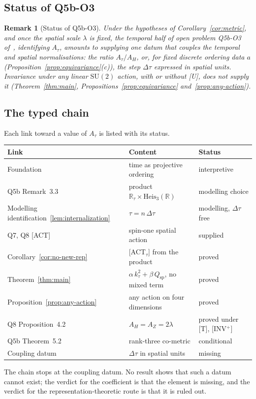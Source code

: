 \documentclass[12pt,a4paper]{article}
\newtheorem{remark}[theorem]{Remark}
\newcommand{\Heis}{\mathrm{Heis}}
\newcommand{\SU}{\mathrm{SU}}
\newcommand{\Qsp}{Q_{\mathrm{sp}}}
\begin{document}
    \subsection{Status of Q5b-O3}

      \begin{remark}[Status of Q5b-O3]
Under the hypotheses of Corollary~\ref{cor:metric}, and once the spatial scale $\lambda$ is fixed, the temporal half
of open problem Q5b-O3 of~\cite{Beau2026q5b}, identifying $A_\tau$, amounts to supplying one datum that couples the
temporal and spatial normalisations: the ratio $A_\tau/A_H$, or, for fixed discrete ordering data $a$
(Proposition~\ref{prop:equivariance}(c)), the step $\Delta\tau$ expressed in spatial units.
Invariance under any linear $\SU(2)$ action, with or without [U], does not supply it
(Theorem~\ref{thm:main}, Propositions~\ref{prop:equivariance} and~\ref{prop:any-action}).
      \end{remark}

    \subsection{The typed chain}

      Each link toward a value of $A_\tau$ is listed with its status.
      \begin{center}
        \small
        \begin{tabular}{lll}
          Link & Content & Status \\
          \hline
          Foundation~\cite{Beau2026m} & time as projective ordering & interpretive \\
          Q5b Remark~3.3~\cite{Beau2026q5b} & product $\mathbb{R}_\tau\times\Heis_3(\mathbb{R})$ & modelling choice \\
          Modelling identification~\ref{lem:internalization} & $\tau = n\,\Delta\tau$ & modelling, $\Delta\tau$ free \\
          Q7, Q8 [ACT]~\cite{Beau2026q7,BeauQ8} & spin-one spatial action & supplied \\
          Corollary~\ref{cor:no-new-rep} & [ACT$_\tau$] from the product & proved \\
          Theorem~\ref{thm:main} & $\alpha\,k_\tau^2 + \beta\,\Qsp$, no mixed term & proved \\
          Proposition~\ref{prop:any-action} & any action on four dimensions & proved \\
          Q8 Proposition~4.2~\cite{BeauQ8} & $A_H = A_Z = 2\lambda$ & proved under [T], [INV$^+$] \\
          Q5b Theorem~5.2~\cite{Beau2026q5b} & rank-three co-metric & conditional \\
          Coupling datum & $\Delta\tau$ in spatial units & missing \\
        \end{tabular}
      \end{center}
      The chain stops at the coupling datum.
      No result shows that such a datum cannot exist; the verdict for the coefficient is that the element is missing,
      and the verdict for the representation-theoretic route is that it is ruled out.
\end{document}
